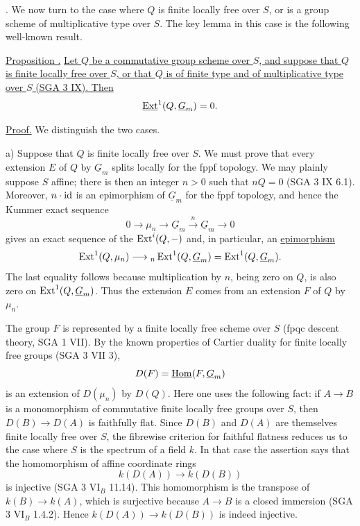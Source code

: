 
\medskip
\noindent {}.  We now turn to the case where $Q$ is finite locally
free over $S$, or is a group scheme of multiplicative type over $S$.
The key lemma in this case is the following well-known result.

\medskip
\noindent\underline{Proposition .}  \underline{Let $Q$ be a
commutative group scheme over $S$, and suppose that $Q$ is finite
locally free over $S$, or that $Q$ is of finite type and of
multiplicative type over $S$ (SGA 3 IX).  Then}
\[
 \uExt^1(Q,\underline G_m)=0.
\]

\noindent\underline{Proof.}  We distinguish the two cases.

\medskip
\noindent a) Suppose that $Q$ is finite locally free over $S$.  We
must prove that every extension $E$ of $Q$ by $\underline G_m$ splits
locally for the fppf topology.  We may plainly suppose $S$ affine;
there is then an integer $n>0$ such that $nQ=0$ (SGA 3 IX 6.1).
Moreover, $n\cdot\mathrm{id}$ is an epimorphism of $\underline G_m$ for the
fppf topology, and hence the Kummer exact sequence
\[
 0\longrightarrow\mu_n\longrightarrow\underline G_m
 \xrightarrow{\ n\ }\underline G_m\longrightarrow0
\]
gives an exact sequence of the $\operatorname{Ext}^i(Q,-)$ and, in particular, an
\underline{epimorphism}
\[
 \Ext^1(Q,\mu_n)\longrightarrow
 {}_n\Ext^1(Q,\underline G_m)=\Ext^1(Q,\underline G_m).
\]
The last equality follows because multiplication by $n$, being zero
on $Q$, is also zero on $\Ext^1(Q,\underline G_m)$.  Thus the
extension $E$ comes from an extension $F$ of $Q$ by $\mu_n$.

The group $F$ is represented by a finite locally free scheme over $S$
(fpqc descent theory, SGA 1 VII).  By the known properties of Cartier
duality for finite locally free groups (SGA 3 VII 3),
\[
 D(F)=\uHom(F,\underline G_m)
\]
is an extension of $D(\mu_n)$ by $D(Q)$.  Here one uses the following
fact: if $A\longrightarrow B$ is a monomorphism of commutative finite
locally free groups over $S$, then
$D(B)\longrightarrow D(A)$ is faithfully flat.  Since $D(B)$ and
$D(A)$ are themselves finite locally free over $S$, the fibrewise
criterion for faithful flatness reduces us to the case where $S$ is
the spectrum of a field $k$.  In that case the assertion says that
the homomorphism of affine coordinate rings
\[
 k(D(A))\longrightarrow k(D(B))
\]
is injective (SGA 3 $\mathrm{VI}_B$ 11.14).  This homomorphism is the
transpose of $k(B)\longrightarrow k(A)$, which is surjective because
$A\longrightarrow B$ is a closed immersion (SGA 3 $\mathrm{VI}_B$
1.4.2).  Hence $k(D(A))\longrightarrow k(D(B))$ is indeed injective.

